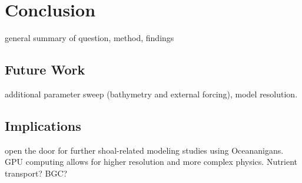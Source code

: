 
\section{Conclusion}

general summary of question, method, findings

\subsection{Future Work}

additional parameter sweep (bathymetry and external forcing), model resolution. 

\subsection{Implications}

open the door for further shoal-related modeling studies using Oceananigans. GPU computing allows for higher resolution and more complex physics. Nutrient transport? BGC? 




